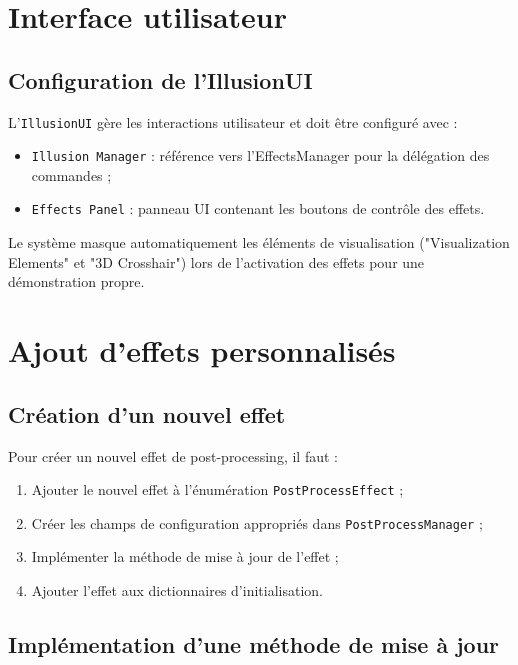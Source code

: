 \documentclass[12pt]{report}
\begin{document}
\section{Interface utilisateur}

\subsection{Configuration de l'IllusionUI}
L'\texttt{IllusionUI} gère les interactions utilisateur et doit être configuré avec :

\begin{itemize}
    \vspace{2mm}
    \item \texttt{Illusion Manager} : référence vers l'EffectsManager pour la délégation des commandes ;
    \vspace{2mm}
    \item \texttt{Effects Panel} : panneau UI contenant les boutons de contrôle des effets.
    \vspace{2mm}
\end{itemize}

Le système masque automatiquement les éléments de visualisation ("Visualization Elements" et "3D Crosshair") lors de l'activation des effets pour une démonstration propre.

\section{Ajout d'effets personnalisés}

\subsection{Création d'un nouvel effet}

Pour créer un nouvel effet de post-processing, il faut :

\begin{enumerate}
    \item Ajouter le nouvel effet à l'énumération \texttt{PostProcessEffect} ;
    \item Créer les champs de configuration appropriés dans \texttt{PostProcessManager} ;
    \item Implémenter la méthode de mise à jour de l'effet ;
    \item Ajouter l'effet aux dictionnaires d'initialisation.
\end{enumerate}

\subsection{Implémentation d'une méthode de mise à jour}
\end{document}
